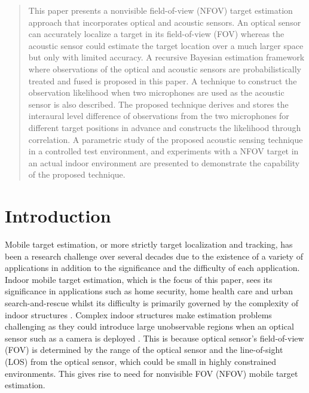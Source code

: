 \maketitle

\begin{abstract}
This paper presents a nonvisible field-of-view (NFOV) target estimation approach that incorporates optical and acoustic sensors.  An optical sensor can accurately localize a target in its field-of-view (FOV) whereas the acoustic sensor could estimate the target location over a much larger space but only with limited accuracy.  A recursive Bayesian estimation framework where observations of the optical and acoustic sensors are probabilistically treated and fused is proposed in this paper. A technique to construct the observation likelihood when two microphones are used as the acoustic sensor is also described.  The proposed technique derives and stores the interaural level difference of observations from the two microphones for different target positions in advance and constructs the likelihood through correlation.  A parametric study of the proposed acoustic sensing technique in a controlled test environment, and experiments with a NFOV target in an actual indoor environment are presented to demonstrate the capability of the proposed technique.  

\end{abstract}

\section{Introduction}
\label{intro} 
Mobile target estimation, or more strictly target localization and tracking, has been a research challenge over several decades due to the existence of a variety of applications in addition to the significance and the difficulty of each application.  Indoor mobile target estimation, which is the focus of this paper, sees its significance in applications such as home security, home health care and urban search-and-rescue whilst its difficulty is primarily governed by the complexity of indoor structures \cite{Bahl2000,Khoury2009}.  Complex indoor structures make estimation problems challenging as they could introduce large unobservable regions when an optical sensor such as a camera is deployed \cite{ledwich04}.  This is because optical sensor's field-of-view (FOV) is determined by the range of the optical sensor and the line-of-sight (LOS) from the optical sensor, which could be small in highly constrained environments.  This gives rise to need for nonvisible FOV (NFOV) mobile target estimation. 
 

